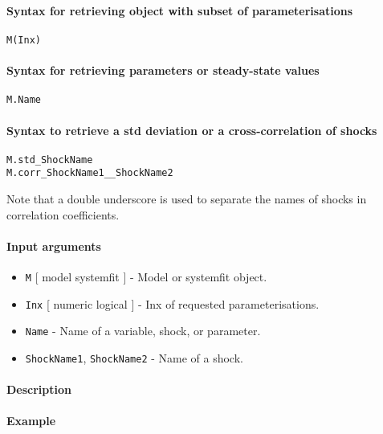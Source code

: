 


	\paragraph{Syntax for retrieving object with subset of
parameterisations}\label{syntax-for-retrieving-object-with-subset-of-parameterisations}

\begin{verbatim}
M(Inx)
\end{verbatim}

\paragraph{Syntax for retrieving parameters or steady-state
values}\label{syntax-for-retrieving-parameters-or-steady-state-values}

\begin{verbatim}
M.Name
\end{verbatim}

\paragraph{Syntax to retrieve a std deviation or a cross-correlation of
shocks}\label{syntax-to-retrieve-a-std-deviation-or-a-cross-correlation-of-shocks}

\begin{verbatim}
M.std_ShockName
M.corr_ShockName1__ShockName2
\end{verbatim}

Note that a double underscore is used to separate the names of shocks in
correlation coefficients.

\paragraph{Input arguments}\label{input-arguments}

\begin{itemize}
\item
  \texttt{M} {[} model \textbar{} systemfit {]} - Model or systemfit
  object.
\item
  \texttt{Inx} {[} numeric \textbar{} logical {]} - Inx of requested
  parameterisations.
\item
  \texttt{Name} - Name of a variable, shock, or parameter.
\item
  \texttt{ShockName1}, \texttt{ShockName2} - Name of a shock.
\end{itemize}

\paragraph{Description}\label{description}

\paragraph{Example}\label{example}


